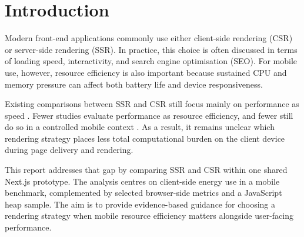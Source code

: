 \section{Introduction}

Modern front-end applications commonly use either client-side rendering (CSR) or server-side rendering (SSR). In practice, this choice is often discussed in terms of loading speed, interactivity, and search engine optimisation (SEO). For mobile use, however, resource efficiency is also important because sustained CPU and memory pressure can affect both battery life and device responsiveness.

Existing comparisons between SSR and CSR still focus mainly on performance as speed \citep{nordstrom2023,clapton2025,ojala2025,gaddam2025}. Fewer studies evaluate performance as resource efficiency, and fewer still do so in a controlled mobile context \citep{thiagarajan2012,kalliola2025}. As a result, it remains unclear which rendering strategy places less total computational burden on the client device during page delivery and rendering.

This report addresses that gap by comparing SSR and CSR within one shared Next.js prototype. The analysis centres on client-side energy use in a mobile benchmark, complemented by selected browser-side metrics and a JavaScript heap sample. The aim is to provide evidence-based guidance for choosing a rendering strategy when mobile resource efficiency matters alongside user-facing performance.
